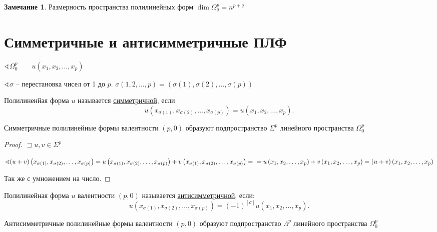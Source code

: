 \documentclass{book}
\theoremstyle{definition}
\newtheorem*{note}{Замечание}
\begin{document}
    \begin{note}
        Размерность пространства полилинейных форм $\dim \Omega_q^p = n^{p+q}$
    \end{note}

    \section{Симметричные и антисимметричные ПЛФ}

    $\sphericalangle \Omega_0^p\qquad u\left( x_1, x_2, \ldots, x_p \right) $ 

    $\sphericalangle \sigma$ -- перестановка чисел от 1 до $p$.  $\sigma\left( 1, 2, \ldots, p \right)  = \left( \sigma(1), \sigma(2), \ldots, \sigma(p) \right) $

    \begin{definition}
    Полилиненйая форма $u$ называется \underline{симметричной}, если \[
            u\left( x_{\sigma(1)}, x_{\sigma(2)}, \ldots, x_{\sigma(p)} \right) = u\left( x_1, x_2, \ldots, x_p \right)
        .\]  
    \end{definition}

    \begin{lemma}
        Симметричные полилинейные формы валентности $(p,0)$ образуют подпространство $\Sigma^p$ линейного пространства $\Omega_0^p$
    \end{lemma}
    \begin{proof}
        $ \sqsupset u, v\in \Sigma^p$

        $\sphericalangle (u+v)\left( x_{\sigma(1)}, x_{\sigma(2)}, \ldots, x_{\sigma(p)} \right) = u\left( x_{\sigma(1)}, x_{\sigma(2)}, \ldots, x_{\sigma(p)} \right)  + v\left( x_{\sigma(1)}, x_{\sigma(2)}, \ldots, x_{\sigma(p)} \right) =\\=u\left( x_1, x_2, \ldots, x_p \right) + v\left( x_1, x_2, \ldots, x_p \right)  = (u+v)\left( x_1, x_2, \ldots, x_p \right)  $

        Так же с умножением на число.
    \end{proof}

    \begin{definition}
        Полилинейная форма $u$ валентности $(p,0)$ называется \underline{антисимметричной}, если:
        \[
            u\left( x_{\sigma(1)}, x_{\sigma(2)}, \ldots, x_{\sigma(p)} \right) = (-1)^{[\sigma]}u(x_1, x_2, \ldots, x_p) 
        .\]
    \end{definition}
    \begin{lemma}
        Антисимметричные полилинейные формы валентности $(p,0)$ образуют подпространство $\Lambda^p$ линейного пространства  $\Omega_0^p$
    \end{lemma}
\end{document}
